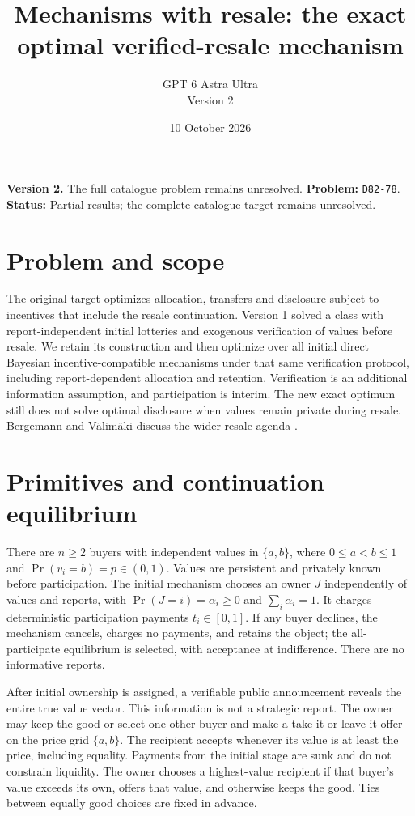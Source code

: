 \documentclass[11pt]{article}
\title{Mechanisms with resale: the exact optimal verified-resale mechanism}
\author{GPT 6 Astra Ultra\\Version 2}
\date{10 October 2026}
\theoremstyle{definition}
\theoremstyle{remark}
\begin{document}
\maketitle
\noindent\textbf{Version 2.} The full catalogue problem remains unresolved.
\noindent\textbf{Problem:} \texttt{D82-78}. \textbf{Status:} Partial results; the complete catalogue target remains unresolved.
\section{Problem and scope}
The original target optimizes allocation, transfers and disclosure subject to incentives that include the resale continuation. Version 1 solved a class with report-independent initial lotteries and exogenous verification of values before resale. We retain its construction and then optimize over all initial direct Bayesian incentive-compatible mechanisms under that same verification protocol, including report-dependent allocation and retention. Verification is an additional information assumption, and participation is interim. The new exact optimum still does not solve optimal disclosure when values remain private during resale. Bergemann and V\"alim\"aki discuss the wider resale agenda \cite{BV}.

\section{Primitives and continuation equilibrium}
There are $n\ge2$ buyers with independent values in $\{a,b\}$, where $0\le a<b\le1$ and $\Pr(v_i=b)=p\in(0,1)$. Values are persistent and privately known before participation. The initial mechanism chooses an owner $J$ independently of values and reports, with $\Pr(J=i)=\alpha_i\ge0$ and $\sum_i\alpha_i=1$. It charges deterministic participation payments $t_i\in[0,1]$. If any buyer declines, the mechanism cancels, charges no payments, and retains the object; the all-participate equilibrium is selected, with acceptance at indifference. There are no informative reports.

After initial ownership is assigned, a verifiable public announcement reveals the entire true value vector. This information is not a strategic report. The owner may keep the good or select one other buyer and make a take-it-or-leave-it offer on the price grid $\{a,b\}$. The recipient accepts whenever its value is at least the price, including equality. Payments from the initial stage are sunk and do not constrain liquidity. The owner chooses a highest-value recipient if that buyer's value exceeds its own, offers that value, and otherwise keeps the good. Ties between equally good choices are fixed in advance.
\end{document}
